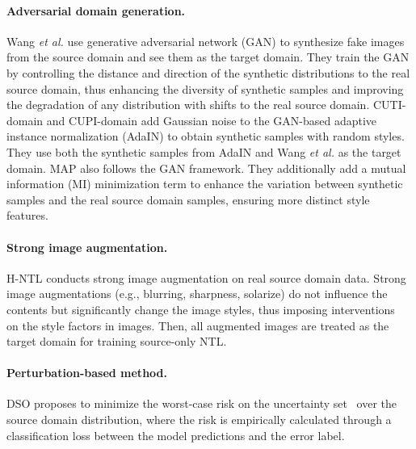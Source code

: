 \paragraph{Adversarial domain generation.} 
Wang \textit{et al.}  use generative adversarial network (GAN) \cite{mirza2014conditional,chen2016infogan} 
to synthesize fake images from the source domain and see them as the target domain.
They train the GAN by controlling the distance and direction of the synthetic distributions to the real source domain, thus enhancing the diversity of synthetic samples and improving the degradation of any distribution with shifts to the real source domain. 
CUTI-domain \cite{wang2023model} and CUPI-domain \cite{wang2024say} add Gaussian noise to the GAN-based adaptive instance normalization (AdaIN) \cite{huang2017arbitrary} to obtain synthetic samples with random styles. They use both the synthetic samples from AdaIN and Wang \textit{et al.}  as the target domain. 
MAP \cite{peng2024map} also follows the GAN framework.
 They additionally add a mutual information (MI) minimization term to enhance the variation between synthetic samples and the real source domain samples, ensuring more distinct style features.

\paragraph{Strong image augmentation.} H-NTL \cite{hong2024improving} conducts strong image augmentation \cite{sohn2020fixmatch,cubuk2020randaugment,huang2023harnessing} on real source domain data.
Strong image augmentations (e.g., blurring, sharpness, solarize) do not influence the contents but significantly change the image styles, thus imposing interventions~\cite{von2021self} on the style factors in images. Then, all augmented images are treated as the target domain for training source-only NTL.

\paragraph{Perturbation-based method.} DSO \cite{wang2023domain} proposes to minimize the worst-case risk on the uncertainty set~\cite{sagawa2019distributionally,huang2023robust,wang2023defending} over the source domain distribution, where the risk is empirically calculated through a classification loss between the model predictions and the error label.


